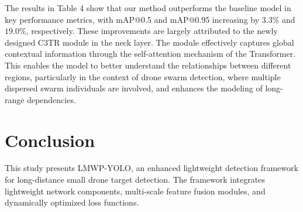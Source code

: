 \documentclass{article}
\begin{document}
The results in Table 4 show that our method outperforms the baseline model in key performance metrics, with mAP@0.5 and mAP@0.95 increasing by $3.3 \%$ and $19.0 \%$, respectively. These improvements are largely attributed to the newly designed C3TR module in the neck layer. The module effectively captures global contextual information through the self-attention mechanism of the Transformer. This enables the model to better understand the relationships between different regions, particularly in the context of drone swarm detection, where multiple dispersed swarm individuals are involved, and enhances the modeling of long-range dependencies.

\section*{Conclusion}
This study presents LMWP-YOLO, an enhanced lightweight detection framework for long-distance small drone target detection. The framework integrates lightweight network components, multi-scale feature fusion modules, and dynamically optimized loss functions.
\end{document}
